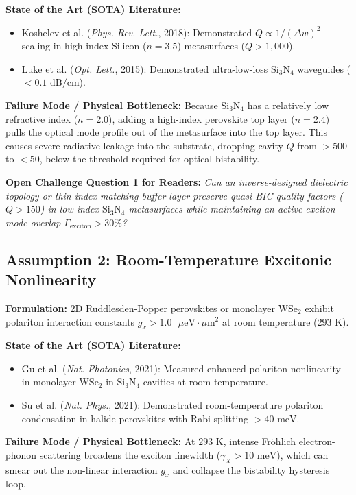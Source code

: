 \documentclass[11pt,a4paper]{article}
\begin{document}
\textbf{State of the Art (SOTA) Literature:}
\begin{itemize}
    \item Koshelev et al. (\textit{Phys. Rev. Lett.}, 2018): Demonstrated $Q \propto 1/(\Delta w)^2$ scaling in high-index Silicon ($n=3.5$) metasurfaces ($Q > 1,000$).
    \item Luke et al. (\textit{Opt. Lett.}, 2015): Demonstrated ultra-low-loss $\text{Si}_3\text{N}_4$ waveguides ($<0.1\text{ dB/cm}$).
\end{itemize}

\textbf{Failure Mode / Physical Bottleneck:}
Because $\text{Si}_3\text{N}_4$ has a relatively low refractive index ($n=2.0$), adding a high-index perovskite top layer ($n=2.4$) pulls the optical mode profile out of the metasurface into the top layer. This causes severe radiative leakage into the substrate, dropping cavity $Q$ from $>500$ to $<50$, below the threshold required for optical bistability.

\textbf{Open Challenge Question 1 for Readers:}
\textit{Can an inverse-designed dielectric topology or thin index-matching buffer layer preserve quasi-BIC quality factors ($Q > 150$) in low-index $\text{Si}_3\text{N}_4$ metasurfaces while maintaining an active exciton mode overlap $\Gamma_{\text{exciton}} > 30\%$?}

\subsection{Assumption 2: Room-Temperature Excitonic Nonlinearity}
\textbf{Formulation:} 2D Ruddlesden-Popper perovskites or monolayer $\text{WSe}_2$ exhibit polariton interaction constants $g_x > 1.0\text{ }\mu\text{eV}\cdot\mu\text{m}^2$ at room temperature ($293\text{ K}$).

\textbf{State of the Art (SOTA) Literature:}
\begin{itemize}
    \item Gu et al. (\textit{Nat. Photonics}, 2021): Measured enhanced polariton nonlinearity in monolayer $\text{WSe}_2$ in $\text{Si}_3\text{N}_4$ cavities at room temperature.
    \item Su et al. (\textit{Nat. Phys.}, 2021): Demonstrated room-temperature polariton condensation in halide perovskites with Rabi splitting $>40\text{ meV}$.
\end{itemize}

\textbf{Failure Mode / Physical Bottleneck:}
At $293\text{ K}$, intense Fr\"ohlich electron-phonon scattering broadens the exciton linewidth ($\gamma_X > 10\text{ meV}$), which can smear out the non-linear interaction $g_x$ and collapse the bistability hysteresis loop.
\end{document}

